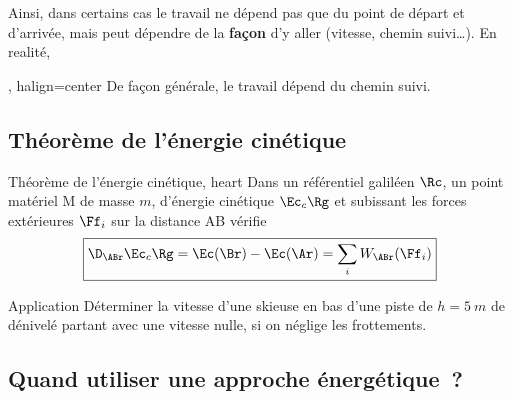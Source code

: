 \documentclass[../main/main.tex]{subfiles}
\begin{document}
Ainsi, dans certains cas le travail ne dépend pas que du point de départ et
d'arrivée, mais peut dépendre de la \textbf{façon} d'y aller (vitesse, chemin
suivi…). En realité,
\begin{tror}{, halign=center}
    De façon générale, le travail dépend du chemin suivi.
\end{tror}

\subsection{Théorème de l'énergie cinétique}

\begin{tprop}{Théorème de l'énergie cinétique, heart}
    Dans un référentiel galiléen $\Rc$, un point matériel M de masse $m$,
    d'énergie cinétique $\Ec_c\Rg$ et subissant les forces extérieures $\Ff_i$
    sur la distance AB vérifie
    \[\boxed{\D_{\ABr}\Ec_c\Rg = \Ec(\Br) - \Ec(\Ar) = \sum_i W_{\ABr}(\Ff_i)}\]
\end{tprop}

\begin{rexem}{Application}
    Déterminer la vitesse d'une skieuse en bas d'une piste de $h = \SI{5}{m}$ de
    dénivelé partant avec une vitesse nulle, si on néglige les frottements.
    \tcblower
    \vspace*{-20pt}
\end{rexem}

\subsection{Quand utiliser une approche énergétique~?}
\end{document}
